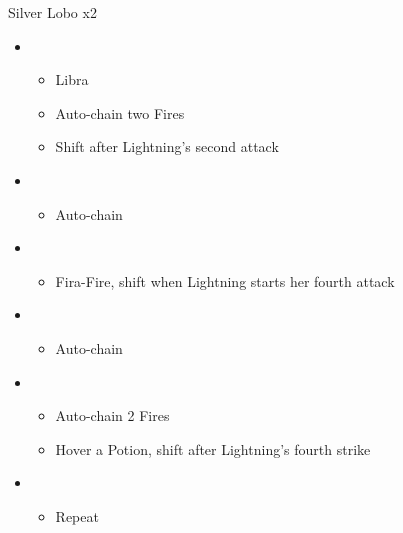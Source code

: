 	\begin{battle}[0:34]{Silver Lobo x2}
		\begin{itemize}
			\item \first
			      \begin{itemize}
				      \item Libra
				      \item Auto-chain two Fires
				      \item Shift after Lightning's second attack
			      \end{itemize}
			\item \fourth
			      \begin{itemize}
				      \item Auto-chain
			      \end{itemize}
			\item \sixth
			      \begin{itemize}
				      \item Fira-Fire, shift when Lightning starts her fourth attack
			      \end{itemize}
			\item \first
			      \begin{itemize}
				      \item Auto-chain
			      \end{itemize}
			\item \fourth
			      \begin{itemize}
				      \item Auto-chain 2 Fires
				      \item Hover a Potion, shift after Lightning's fourth strike
			      \end{itemize}
			\item \sixth
			      \begin{itemize}
				      \item Repeat
			      \end{itemize}
		\end{itemize}
	\end{battle}
	\vfill

